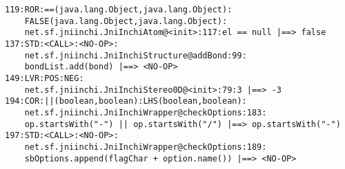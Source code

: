 \begin{lstlisting}
119:ROR:==(java.lang.Object,java.lang.Object):
	FALSE(java.lang.Object,java.lang.Object):
	net.sf.jniinchi.JniInchiAtom@<init>:117:el == null |==> false
137:STD:<CALL>:<NO-OP>:
	net.sf.jniinchi.JniInchiStructure@addBond:99:
	bondList.add(bond) |==> <NO-OP>
149:LVR:POS:NEG:
	net.sf.jniinchi.JniInchiStereo0D@<init>:79:3 |==> -3
194:COR:||(boolean,boolean):LHS(boolean,boolean):
	net.sf.jniinchi.JniInchiWrapper@checkOptions:183:
	op.startsWith("-") || op.startsWith("/") |==> op.startsWith("-")
197:STD:<CALL>:<NO-OP>:
	net.sf.jniinchi.JniInchiWrapper@checkOptions:189:
	sbOptions.append(flagChar + option.name()) |==> <NO-OP>
\end{lstlisting}
